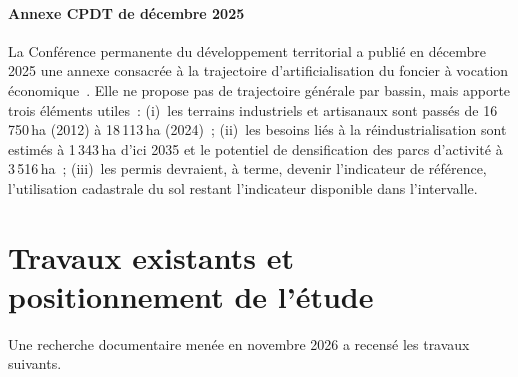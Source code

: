 \documentclass[11pt,a4paper]{report}
\newcommand{\ha}{\,ha}
\begin{document}
\paragraph{Annexe CPDT de décembre 2025} La Conférence permanente du développement territorial a publié en décembre 2025 une annexe consacrée à la trajectoire d'artificialisation du foncier à vocation économique~\citep{cpdt2025}. Elle ne propose pas de trajectoire générale par bassin, mais apporte trois éléments utiles~: (i)~les terrains industriels et artisanaux sont passés de 16\,750\ha{} (2012) à 18\,113\ha{} (2024)~; (ii)~les besoins liés à la réindustrialisation sont estimés à 1\,343\ha{} d'ici 2035 et le potentiel de densification des parcs d'activité à 3\,516\ha~; (iii)~les permis devraient, à terme, devenir l'indicateur de référence, l'utilisation cadastrale du sol restant l'indicateur disponible dans l'intervalle.

\section{Travaux existants et positionnement de l'étude}
\label{sec:existant}
Une recherche documentaire menée en novembre 2026 a recensé les travaux suivants.
\end{document}
